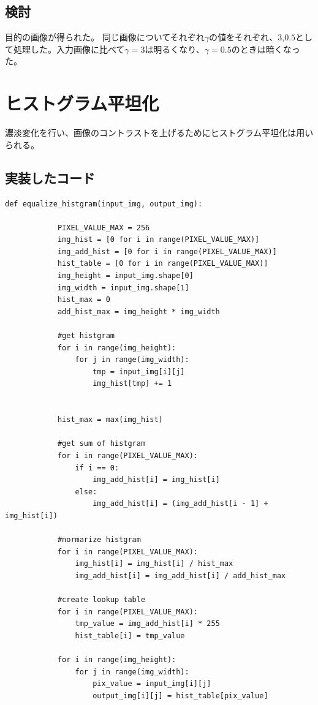 \documentclass[11pt,a4j]{jsarticle}
\begin{document}
    \subsection{検討}
    目的の画像が得られた。
    同じ画像についてそれぞれ$\gamma$の値をそれぞれ、$3$,$0.5$として処理した。入力画像に比べて$\gamma = 3$は明るくなり、$\gamma = 0.5$のときは暗くなった。
    \section{ヒストグラム平坦化}
    濃淡変化を行い、画像のコントラストを上げるためにヒストグラム平坦化は用いられる。
    \subsection{実装したコード}
    \begin{lstlisting}[basicstyle=\ttfamily\footnotesize, frame=single]
        def equalize_histgram(input_img, output_img):

            PIXEL_VALUE_MAX = 256
            img_hist = [0 for i in range(PIXEL_VALUE_MAX)]
            img_add_hist = [0 for i in range(PIXEL_VALUE_MAX)]
            hist_table = [0 for i in range(PIXEL_VALUE_MAX)]
            img_height = input_img.shape[0]
            img_width = input_img.shape[1]
            hist_max = 0
            add_hist_max = img_height * img_width

            #get histgram
            for i in range(img_height):
                for j in range(img_width):
                    tmp = input_img[i][j]
                    img_hist[tmp] += 1


            hist_max = max(img_hist)

            #get sum of histgram
            for i in range(PIXEL_VALUE_MAX):
                if i == 0:
                    img_add_hist[i] = img_hist[i]
                else:
                    img_add_hist[i] = (img_add_hist[i - 1] + img_hist[i])

            #normarize histgram
            for i in range(PIXEL_VALUE_MAX):
                img_hist[i] = img_hist[i] / hist_max
                img_add_hist[i] = img_add_hist[i] / add_hist_max

            #create lookup table
            for i in range(PIXEL_VALUE_MAX):
                tmp_value = img_add_hist[i] * 255
                hist_table[i] = tmp_value

            for i in range(img_height):
                for j in range(img_width):
                    pix_value = input_img[i][j]
                    output_img[i][j] = hist_table[pix_value]
    \end{lstlisting}
\end{document}
